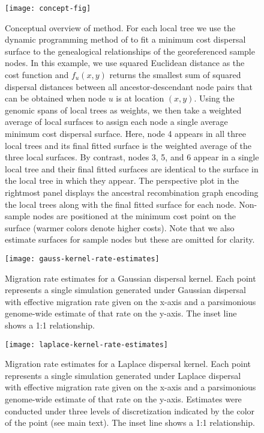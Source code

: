 \begin{figure}[h]
\centering
\texttt{[image: concept-fig]}
\caption{Conceptual overview of method. For each local tree we use the dynamic
programming method of \citet{Sankoff_Rousseau_1975} to fit a minimum cost
dispersal surface to the genealogical relationships of the georeferenced sample
nodes. In this example, we use squared Euclidean distance as the cost function 
and $f_u(x,y)$ returns the smallest sum of squared dispersal distances between 
all ancestor-descendant node pairs that can be obtained when node $u$ is at 
location $(x,y)$. Using the genomic spans of local trees as weights, we then 
take a weighted average of local surfaces to assign each node a single average 
minimum cost dispersal surface. Here, node 4 appears in all three 
local trees and its final fitted surface is the weighted average of the three 
local surfaces. By contrast, nodes 3, 5, and 6 appear in a single local tree 
and their final fitted surfaces are identical to the surface in the local tree 
in which they appear. The perspective plot in the rightmost panel displays the
ancestral recombination graph encoding the local trees along with the final 
fitted surface for each node. Non-sample nodes are positioned at the minimum cost 
point on the surface (warmer colors denote higher costs). Note that we also 
estimate surfaces for sample nodes but these are omitted for clarity. 
}
\label{fig:concept-fig}
\end{figure}

\begin{figure}[h]
\centering
\texttt{[image: gauss-kernel-rate-estimates]}
\caption{Migration rate estimates for a Gaussian dispersal kernel. Each point
represents a single simulation generated under Gaussian dispersal with effective
migration rate given on the x-axis and a parsimonious genome-wide estimate of that
rate on the y-axis. The inset line shows a 1:1 relationship.
}
\label{fig:gauss-kernel-rate-estimates}
\end{figure}

\begin{figure}[h]
\centering
\texttt{[image: laplace-kernel-rate-estimates]}
\caption{Migration rate estimates for a Laplace dispersal kernel. Each point
represents a single simulation generated under Laplace dispersal with effective
migration rate given on the x-axis and a parsimonious genome-wide estimate of
that rate on the y-axis. Estimates were conducted under three levels of 
discretization indicated by the color of the point (see main text).
The inset line shows a 1:1 relationship.
}
\label{fig:lapl-kernel-rate-estimates}
\end{figure}

